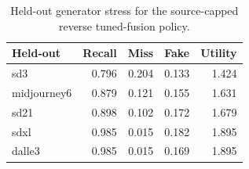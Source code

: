 \begin{table}[t]
\centering
\small
\caption{Held-out generator stress for the source-capped reverse tuned-fusion policy.}
\label{tab:source-holdout-stress}
\begin{tabular}{l r r r r}
\toprule
Held-out & Recall & Miss & Fake & Utility \\
\midrule
sd3 & 0.796 & 0.204 & 0.133 & 1.424 \\
midjourney6 & 0.879 & 0.121 & 0.155 & 1.631 \\
sd21 & 0.898 & 0.102 & 0.172 & 1.679 \\
sdxl & 0.985 & 0.015 & 0.182 & 1.895 \\
dalle3 & 0.985 & 0.015 & 0.169 & 1.895 \\
\bottomrule
\end{tabular}
\end{table}
